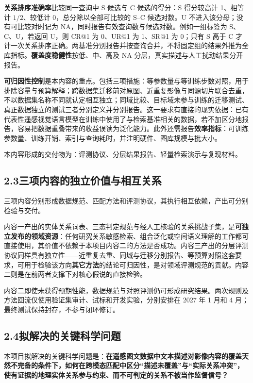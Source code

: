 \textbf{关系排序准确率}比较同一查询中 S 候选与 C 候选的得分：S 得分较高计 1、相等计 $1/2$、较低计 0，总分除以全部可比较的 S--C 候选对数。U 不进入该分母；没有可比较对时记为 NA，同时报告有效查询数与候选对数。例如一组标签为 S、C、U，若返回 U，则 CR@1 为 0、UR@1 为 1、SR@1 为 0；只有 S 高于 C 才计一次关系排序正确。两基准分别报告并按查询合并，不将固定组的结果外推为全库指标。\textbf{覆盖度稳健性}按低、中、高及 NA 分层，真实描述与人工扰动结果分开报告。

\textbf{可归因性控制}是本内容的重点。包括三项措施：等参数量与等训练步数对照，用于排除容量与预算解释；跨数据集迁移前对原图、近重复影像与同源切片联合去重，不以数据集名称不同就认定相互独立；同域比较、目标域未参与训练的迁移测试、真正数据独立的测试三者分别定义并分别报告。这一要求有直接的现实依据：已有代表性遥感视觉语言模型在训练中使用了与检索基准相关的数据\cite{liu2024remoteclip}，若不加区分地报告，容易把数据重叠带来的收益误读为泛化能力。此外还需报告\textbf{效率指标}：可训练参数量、训练开销、索引与查询耗时，并注明硬件、图库规模与批大小。

本内容形成的交付物为：评测协议、分层结果报告、轻量检索演示与复现材料。

\subsection*{2.3\quad 三项内容的独立价值与相互关系}

三项内容分别形成数据规范、匹配方法和评测协议，其执行相互依赖，产出可分别检验与交付。

内容一产出的实体关系词表、三态判定规范与经人工核验的关系挑战子集，是\textbf{可独立发布的领域资源}：任何研究关系敏感检索、组合泛化或空间语义理解的工作都可直接使用，其价值不依赖于本项目内容二的方法是否成功。内容三产出的分层评测协议同样具有独立性——近重复去重、同域与迁移分别报告、等预算对照这套要求，可用于检验该方向\textbf{其它方法}的结论可归因性，是对领域评测规范的贡献。内容二则是在前两者支撑下对核心假说的直接检验。

内容二即使未获得预期性能，数据规范与对照评测仍可形成研究结果。两次规则及方法回流仅使用验证集审计、试标和开发实验，分别安排在 2027 年 1 月和 4 月；最终测试保持封存，不参与闭环修订。

\subsection*{2.4\quad 拟解决的关键科学问题}

本项目拟解决的关键科学问题是：\textbf{在遥感图文数据中文本描述对影像内容的覆盖天然不完备的条件下，如何在跨模态匹配中区分“描述未覆盖”与“实际关系冲突”，使有证据的地理实体关系参与约束、而不可判定的关系不被当作监督信号？}

